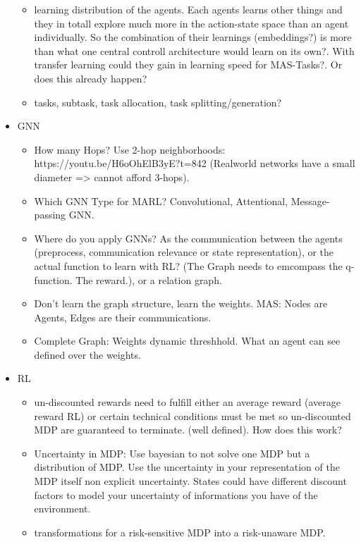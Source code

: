 \begin{itemize}[noitemsep,nolistsep]
\begin{itemize}[noitemsep,nolistsep]
		\item learning distribution of the agents. Each agents learns other things and they in totall explore much more in the action-state space than an agent individually. So the combination of their learnings (embeddings?) is more than what one central controll architecture would learn on its own?. With transfer learning could they gain in learning speed for MAS-Tasks?. Or does this already happen?
		\item tasks, subtask, task allocation, task splitting/generation?
	\end{itemize}
	\item GNN
	\begin{itemize}[noitemsep,nolistsep]
		\item How many Hops? Use 2-hop neighborhoods: https://youtu.be/H6oOhElB3yE?t=842 (Realworld networks have a small diameter => cannot afford 3-hops).
		\item Which GNN Type for MARL? Convolutional, Attentional, Message-passing GNN.
		\item Where do you apply GNNs? As the communication between the agents (preprocess, communication relevance or state representation), or the actual function to learn with RL? (The Graph needs to emcompass the q-function. The reward.), or a relation graph. 
		\item Don't learn the graph structure, learn the weights. MAS: Nodes are Agents, Edges are their communications.
		\item Complete Graph: Weights dynamic threshhold. What an agent can see defined over the weights.
	\end{itemize}
	\item RL
	\begin{itemize}[noitemsep,nolistsep]
		\item un-discounted rewards need to fulfill either an average reward (average reward RL) or certain technical conditions must be met so un-discounted MDP are guaranteed to terminate. (well defined). How does this work?
		\item Uncertainty in MDP: Use bayesian to not solve one MDP but a distribution of MDP. Use the uncertainty in your representation of the MDP itself non explicit uncertainty. States could have different discount factors to model your uncertainty of informations you have of the environment.
		\item transformations for a risk-sensitive MDP into a risk-unaware MDP.
	\end{itemize}
\end{itemize}